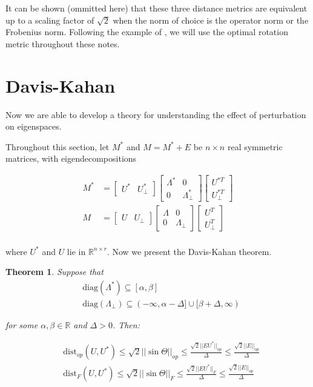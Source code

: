 \documentclass{amsart}
\newcommand{\R}{\mathbb{R}}
\newcommand{\dist}{\textrm{dist}}
\newtheorem{theorem}{Theorem}
\begin{document}
It can be shown (ommitted here) that these three distance metrics are equivalent up to a scaling factor of $\sqrt{2}$ when the norm of choice is the operator norm or the Frobenius norm. Following the example of \cite{chen_spectral_2021}, we will use the optimal rotation metric throughout these notes.

\section{Davis-Kahan}

Now we are able to develop a theory for understanding the effect of perturbation on eigenspaces.

\bigskip

Throughout this section, let $M^{*}$ and $M = M^{*} + E$ be $n \times n$ real symmetric matrices, with eigendecompositions

\begin{align*}
  M^{*} &= \begin{bmatrix}U^{*} & U^{*}_{\perp} \end{bmatrix} \begin{bmatrix}\Lambda^{*} & 0 \\ 0 & \Lambda^{*}_{\perp} \end{bmatrix} \begin{bmatrix} U^{*T} \\ U^{*T}_{\perp}\end{bmatrix} \\
  M &= \begin{bmatrix}U & U_{\perp} \end{bmatrix} \begin{bmatrix}\Lambda & 0 \\ 0 & \Lambda_{\perp} \end{bmatrix} \begin{bmatrix} U^{T} \\ U^{T}_{\perp}\end{bmatrix} \\
\end{align*}

where $U^{*}$ and $U$ lie in $\R^{n \times r}$. Now we present the Davis-Kahan theorem.

\begin{theorem}
  Suppose that
  \begin{align*}
    &\textrm{diag} (\Lambda^{*}) \subseteq [\alpha, \beta] \\
    &\textrm{diag} (\Lambda_{{\perp}}) \subseteq (-\infty, \alpha - \Delta] \cup [\beta + \Delta, \infty)
  \end{align*}

  for some $\alpha, \beta \in \R$ and $\Delta > 0$. Then:

  \begin{align*}
    &\dist_{op} (U, U^{*}) \leq \sqrt{2}||\sin \Theta ||_{op} \leq \frac{\sqrt{2}||EU^{*}||_{op}}{\Delta} \leq \frac{\sqrt{2}||E||_{op}}{\Delta} \\
    &\dist_{F}(U, U^{*}) \leq \sqrt{2}||\sin \Theta ||_{F} \leq \frac{\sqrt{2}||EU^{*}||_{F}}{\Delta} \leq \frac{\sqrt{2}||E||_{op}}{\Delta}
   \end{align*}

\end{theorem}
\end{document}
